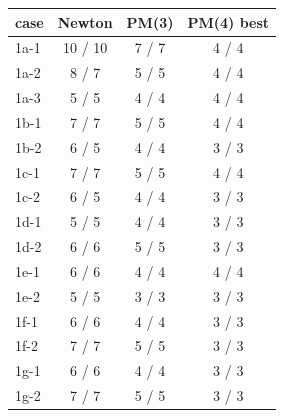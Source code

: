 \begin{tabular}{lccc}
\toprule
case & Newton & PM(3) & PM(4) best \\
\midrule
1a-1 & 10 / 10 & 7 / 7 & 4 / 4 \\
1a-2 & 8 / 7 & 5 / 5 & 4 / 4 \\
1a-3 & 5 / 5 & 4 / 4 & 4 / 4 \\
1b-1 & 7 / 7 & 5 / 5 & 4 / 4 \\
1b-2 & 6 / 5 & 4 / 4 & 3 / 3 \\
1c-1 & 7 / 7 & 5 / 5 & 4 / 4 \\
1c-2 & 6 / 5 & 4 / 4 & 3 / 3 \\
1d-1 & 5 / 5 & 4 / 4 & 3 / 3 \\
1d-2 & 6 / 6 & 5 / 5 & 3 / 3 \\
1e-1 & 6 / 6 & 4 / 4 & 4 / 4 \\
1e-2 & 5 / 5 & 3 / 3 & 3 / 3 \\
1f-1 & 6 / 6 & 4 / 4 & 3 / 3 \\
1f-2 & 7 / 7 & 5 / 5 & 3 / 3 \\
1g-1 & 6 / 6 & 4 / 4 & 3 / 3 \\
1g-2 & 7 / 7 & 5 / 5 & 3 / 3 \\
\bottomrule
\end{tabular}
